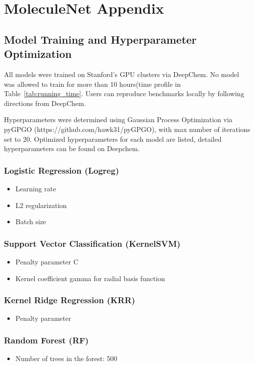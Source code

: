 
\section{MoleculeNet Appendix}

\subsection{Model Training and Hyperparameter Optimization}
All models were trained on Stanford's GPU clusters via DeepChem. No model was allowed to train for more than 10 hours(time profile in Table~\ref{tab:running_time}. Users can reproduce benchmarks locally by following directions from DeepChem.

Hyperparameters were determined using Gaussian Process Optimization via pyGPGO (https://github.com/hawk31/pyGPGO), with max number of iterations set to 20. Optimized hyperparameters for each model are listed, detailed hyperparameters can be found on Deepchem.

\subsubsection{Logistic Regression (Logreg)}
\begin{itemize}
    \item Learning rate
    \item L2 regularization
    \item Batch size
\end{itemize}

\subsubsection{Support Vector Classification (KernelSVM)}
\begin{itemize}
    \item Penalty parameter C
    \item Kernel coefficient gamma for radial basis function
\end{itemize}

\subsubsection{Kernel Ridge Regression (KRR)}
\begin{itemize}
    \item Penalty parameter
\end{itemize}

\subsubsection{Random Forest (RF)}
\begin{itemize}
    \item Number of trees in the forest: 500
\end{itemize}

